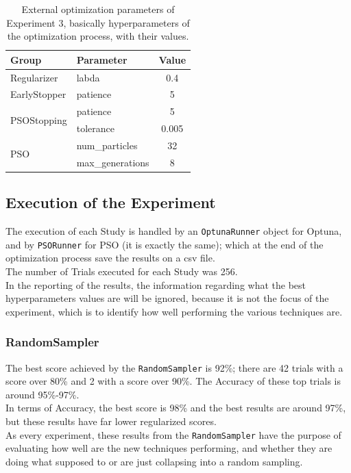 \begin{table}[ht!]
	\center
	\setlength{\tabcolsep}{0.5cm}
	\caption[Optimization External Parameters of Experiment 3]{External optimization parameters of Experiment 3, basically hyperparameters of the optimization process, with their values.}
	\begin{tabular}{@{}llc@{}}
		\toprule
		\textbf{Group}               & \textbf{Parameter} & \textbf{Value} \\ \midrule
		Regularizer                  & labda              & 0.4            \\[0.1cm]
		EarlyStopper                 & patience           & 5              \\[0.2cm]
		\multirow{2}{*}{PSOStopping} & patience           & 5              \\[0.1cm]
									 & tolerance          & 0.005          \\[0.2cm]
		\multirow{2}{*}{PSO}         & num\_particles     & 32             \\[0.1cm]
									 & max\_generations   & 8              \\ \bottomrule
	\end{tabular}
	\label{tab:table-4.3.2}
\end{table}

\subsection{Execution of the Experiment}

The execution of each Study is handled by an \texttt{OptunaRunner} object for Optuna, and by \texttt{PSORunner} for PSO (it is exactly the same); which at the end of the optimization process save the results on a csv file.
\\[0.3cm]The number of Trials executed for each Study was 256.
\\[0.3cm]In the reporting of the results, the information regarding what the best hyperparameters values are will be ignored, because it is not the focus of the experiment, which is to identify how well performing the various techniques are.

\subsubsection{RandomSampler}

The best score achieved by the \texttt{RandomSampler} is 92\%; there are 42 trials with a score over 80\% and 2 with a score over 90\%. The Accuracy of these top trials is around 95\%-97\%.
\\[0.3cm]In terms of Accuracy, the best score is 98\% and the best results are around 97\%, but these results have far lower regularized scores.
\\[0.3cm]As every experiment, these results from the \texttt{RandomSampler} have the purpose of evaluating how well are the new techniques performing, and whether they are doing what supposed to or are just collapsing into a random sampling.

